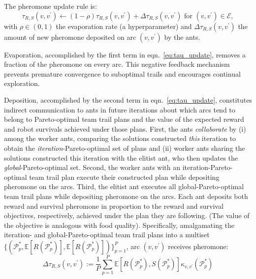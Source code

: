 \documentclass[fleqn,10pt,lineno]{wlpeerj}
\begin{document}
The pheromone update rule is:
\begin{equation}
	\tau_{R, S}(v, v^\prime) \leftarrow (1-\rho) \tau_{R,S}(v, v^\prime)  + \Delta \tau_{R,S}(v, v^\prime) \text{ for } (v, v^\prime) \in \mathcal{E}, \label{eq:tau_update}
\end{equation}
with $\rho \in (0, 1)$ the evaporation rate (a hyperparameter) and $\Delta \tau_{R,S}(v, v^\prime)$ the amount of new pheromone deposited on arc $(v, v^\prime)$ by the ants.

Evaporation, accomplished by the first term in eqn.~\ref{eq:tau_update}, removes a fraction of the pheromone on every arc. This negative feedback mechanism prevents premature convergence to suboptimal trails and encourages continual exploration.

Deposition, accomplished by the second term in eqn.~\ref{eq:tau_update}, constitutes indirect communication to ants in future iterations about which arcs tend to belong to Pareto-optimal team trail plans and the value of the expected reward and robot survivals achieved under those plans.
First, the ants \emph{collaborate} by 
(i) among the worker ants, comparing the solutions constructed \emph{this} iteration to obtain the \emph{iteration}-Pareto-optimal set of plans
and 
(ii) worker ants sharing the solutions constructed this iteration with the elitist ant, who then updates the \emph{global}-Pareto-optimal set.
Second, the worker ants with an iteration-Pareto-optimal team trail plan execute their constructed plan while depositing pheromone on the arcs.
Third, the elitist ant executes all global-Pareto-optimal team trail plans while depositing pheromone on the arcs. Each ant deposits both reward and survival pheromone in proportion to the reward and survival objectives, respectively, achieved under the plan they are following. (The value of the objective is analogous with food quality). 
Specifically, amalgamating the iteration- and global-Pareto-optimal team trail plans into a multiset $\{(\mathcal{P}_p^*, \mathbb{E}[R(\mathcal{P}_p^*)], \mathbb{E}[R(\mathcal{P}_p^*)])\}_{p=1}^P$, arc $(v, v^\prime)$ receives pheromone:
\begin{equation}
	 \Delta \tau_{R,S}(v, v^\prime) := 
	\frac{1}{P} \sum_{p=1}^{P} \mathbb{E}[R(\mathcal{P}^*_p), S(\mathcal{P}^*_p)] 
	\kappa_{v, v^\prime}(\mathcal{P}^*_p) 
\end{equation}
\end{document}
